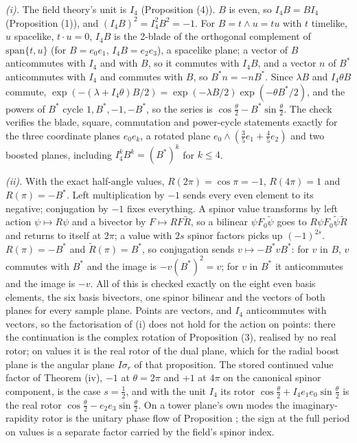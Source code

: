 \emph{(i).} The field theory's unit is $I_{4}$ (Proposition (4)). $B$ is even, so $I_{4}B = BI_{4}$ (Proposition (1)), and $(I_{4}B)^{2} = I_{4}^{2}B^{2} = -1$. For $B = t \wedge u = tu$ with $t$ timelike, $u$ spacelike, $t \cdot u = 0$, $I_{4}B$ is the 2-blade of the orthogonal complement of $\mathrm{span}\{t, u\}$ (for $B = e_{0}e_{1}$, $I_{4}B = e_{2}e_{3}$), a spacelike plane; a vector of $B$ anticommutes with $I_{4}$ and with $B$, so it commutes with $I_{4}B$, and a vector $n$ of $B^{*}$ anticommutes with $I_{4}$ and commutes with $B$, so $B^{*}n = -nB^{*}$. Since $\lambda B$ and $I_{4}\theta B$ commute, $\exp(-(\lambda + I_{4}\theta)B/2) = \exp(-\lambda B/2)\exp(-\theta B^{*}/2)$, and the powers of $B^{*}$ cycle $1, B^{*}, -1, -B^{*}$, so the series is $\cos\tfrac{\theta}{2} - B^{*}\sin\tfrac{\theta}{2}$. The check verifies the blade, square, commutation and power-cycle statements exactly for the three coordinate planes $e_{0}e_{k}$, a rotated plane $e_{0}\wedge(\tfrac35e_{1} + \tfrac45e_{2})$ and two boosted planes, including $I_{4}^{k}B^{k} = (B^{*})^{k}$ for $k \le 4$.

\emph{(ii).} With the exact half-angle values, $R(2\pi) = \cos\pi = -1$, $R(4\pi) = 1$ and $R(\pi) = -B^{*}$. Left multiplication by $-1$ sends every even element to its negative; conjugation by $-1$ fixes everything. A spinor value transforms by left action $\psi \mapsto R\psi$ and a bivector by $F \mapsto RF\tilde R$, so a bilinear $\psi F_{0}\tilde\psi$ goes to $R\psi F_{0}\tilde\psi\tilde R$ and returns to itself at $2\pi$; a value with $2s$ spinor factors picks up $(-1)^{2s}$. $R(\pi) = -B^{*}$ and $\tilde R(\pi) = B^{*}$, so conjugation sends $v \mapsto -B^{*}vB^{*}$: for $v$ in $B$, $v$ commutes with $B^{*}$ and the image is $-v(B^{*})^{2} = v$; for $v$ in $B^{*}$ it anticommutes and the image is $-v$. All of this is checked exactly on the eight even basis elements, the six basis bivectors, one spinor bilinear and the vectors of both planes for every sample plane. Points are vectors, and $I_{4}$ anticommutes with vectors, so the factorisation of (i) does not hold for the action on points: there the continuation is the complex rotation of Proposition (3), realised by no real rotor; on values it is the real rotor of the dual plane, which for the radial boost plane is the angular plane $I\sigma_{r}$ of that proposition. The stored continued value factor of Theorem (iv), $-1$ at $\theta = 2\pi$ and $+1$ at $4\pi$ on the canonical spinor component, is the case $s = \tfrac12$, and with the unit $I_{4}$ its rotor $\cos\tfrac{\theta}{2} + I_{4}e_{1}e_{0}\sin\tfrac{\theta}{2}$ is the real rotor $\cos\tfrac{\theta}{2} - e_{2}e_{3}\sin\tfrac{\theta}{2}$. On a tower plane's own modes the imaginary-rapidity rotor is the unitary phase flow of Proposition ; the sign at the full period on values is a separate factor carried by the field's spinor index.


